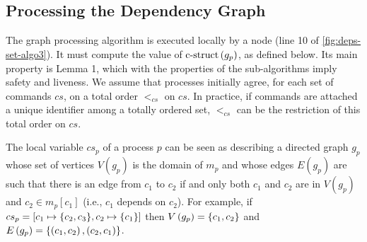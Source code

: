 \subsection{Processing the Dependency Graph}
\label{abstract-algo}

\begin{comment}
Local variables: $m_p$, a map from commands to dependency sets, initially the empty map; $\sigma_p$, a c-struct, initially $\bot$.
\begin{itemize}[noitemsep,nolistsep]
    \item Upon ${\opn{propose}\left( c \right)}^p$: call ${\opn{announce}\left( c \right)}^p$.
    \item Upon ${\opn{suggest}\left( c,d \right)}^p$: call ${\opn{propose}\left( c,d \right)}^p$.
    \item Upon ${\opn{decide}\left( c,d \right)}^p$: insert the mapping $c \rightarrow d$ in the map $m_p$.
    \item Periodically, update $\sigma_p$ to $\opn{c-struct}\left( m_p \right)$, where $\opn{c-struct}\left( m_p \right)$ is defined below.
\end{itemize}

\end{comment}

The graph processing algorithm is executed locally by a node (line 10 of \cref{fig:deps-set-algo3}). It must compute the value of $\operatorname{c-struct}\left( g_p \right)$, as defined below.
Its main property is Lemma 1, which with the properties of the sub-algorithms imply safety and liveness. 
We assume that processes initially agree, for each set of commands $cs$, on a total order $<_{cs}$ on $cs$.
In practice, if commands are attached a unique identifier among a totally ordered set, $<_{cs}$ can be the restriction of this total order on $cs$.

The local variable $cs_p$ of a process $p$ can be seen as describing a directed graph $g_p$ whose set of vertices $V\left( g_p \right)$ is the domain of $m_p$ and whose edges $E\left( g_p \right)$ are such that there is an edge from $c_1$ to $c_2$ if and only both $c_1$ and $c_2$ are in $V\left( g_p \right)$ and $c_2 \in m_p\left[ c_1 \right]$ (i.e., $c_1$ depends on $c_2$). For example, if $cs_p = \left[ c_1 \mapsto \aset{c_2,c_3}, c_2 \mapsto \aset{c_1} \right]$ then $V\left(
g_p \right) = \left\{c_1,c_2\right\}$ and $E\left( g_p \right) = \left\{\left( c_1,c_2 \right),\left( c_2,c_1 \right)\right\}$.

